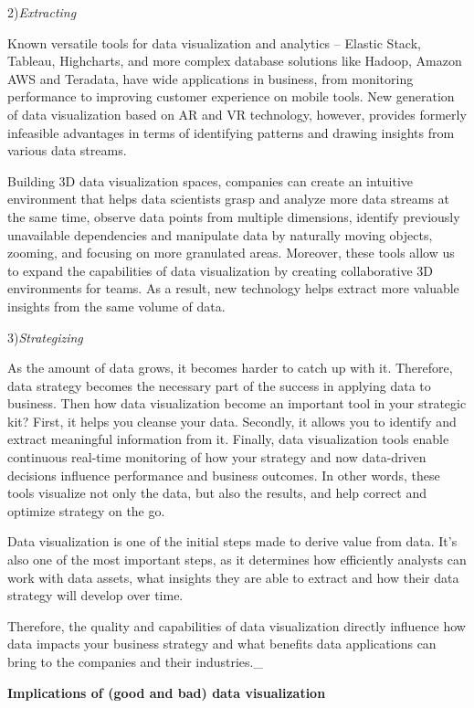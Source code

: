 \documentclass[]{book}
\theoremstyle{definition}
\theoremstyle{definition}
\theoremstyle{definition}
\theoremstyle{remark}
\begin{document}
2)\emph{Extracting}

Known versatile tools for data visualization and analytics -- Elastic
Stack, Tableau, Highcharts, and more complex database solutions like
Hadoop, Amazon AWS and Teradata, have wide applications in business,
from monitoring performance to improving customer experience on mobile
tools. New generation of data visualization based on AR and VR
technology, however, provides formerly infeasible advantages in terms of
identifying patterns and drawing insights from various data streams.

Building 3D data visualization spaces, companies can create an intuitive
environment that helps data scientists grasp and analyze more data
streams at the same time, observe data points from multiple dimensions,
identify previously unavailable dependencies and manipulate data by
naturally moving objects, zooming, and focusing on more granulated
areas. Moreover, these tools allow us to expand the capabilities of data
visualization by creating collaborative 3D environments for teams. As a
result, new technology helps extract more valuable insights from the
same volume of data.

3)\emph{Strategizing}

As the amount of data grows, it becomes harder to catch up with it.
Therefore, data strategy becomes the necessary part of the success in
applying data to business. Then how data visualization become an
important tool in your strategic kit? First, it helps you cleanse your
data. Secondly, it allows you to identify and extract meaningful
information from it. Finally, data visualization tools enable continuous
real-time monitoring of how your strategy and now data-driven decisions
influence performance and business outcomes. In other words, these tools
visualize not only the data, but also the results, and help correct and
optimize strategy on the go.

Data visualization is one of the initial steps made to derive value from
data. It's also one of the most important steps, as it determines how
efficiently analysts can work with data assets, what insights they are
able to extract and how their data strategy will develop over time.

Therefore, the quality and capabilities of data visualization directly
influence how data impacts your business strategy and what benefits data
applications can bring to the companies and their industries.\_

\textbf{Implications of (good and bad) data visualization}
\end{document}
